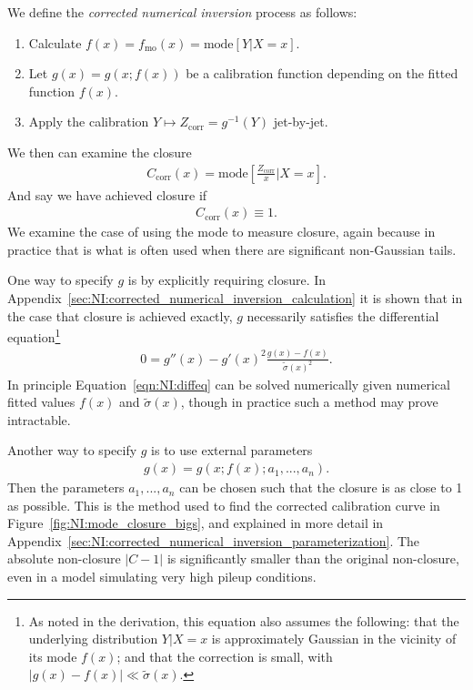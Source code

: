 We define the \emph{corrected numerical inversion} process as follows:
\begin{enumerate}
\item Calculate $f(x)=f_\text{mo}(x)=\text{mode}[Y|X=x]$.
\item Let $g(x) = g(x;f(x))$ be a calibration function depending on the fitted function $f(x)$.
\item Apply the calibration $Y\mapsto Z_\text{corr}=g^{-1}(Y)$ jet-by-jet.
\end{enumerate}
We then can examine the closure
\begin{align}
C_\text{corr}(x) = \text{mode}\left[\frac{Z_\text{corr}}{x}\Big|X=x\right].
\end{align}
And say we have achieved closure if
\begin{align}
C_\text{corr}(x) \equiv 1.
\end{align}
We examine the case of using the mode to measure closure, again because in practice that is what is often used when there are significant non-Gaussian tails. 

One way to specify $g$ is by explicitly requiring closure. In Appendix~\ref{sec:NI:corrected_numerical_inversion_calculation} it is shown that in the case that closure is achieved exactly, $g$ necessarily satisfies the differential equation\footnote{As noted in the derivation, this equation also assumes the following: that the underlying distribution $Y|X=x$ is approximately Gaussian in the vicinity of its mode $f(x)$; and that the correction is small, with $|g(x)-f(x)|\ll \tilde{\sigma}(x)$.}
\begin{align}
0=g''(x)-g'(x)^2\frac{g(x)-f(x)}{\tilde{\sigma}(x)^2}.
\label{eqn:NI:diffeq}
\end{align}
In principle Equation~\ref{eqn:NI:diffeq} can be solved numerically given numerical fitted values $f(x)$ and $\tilde{\sigma}(x)$, though in practice such a method may prove intractable.

Another way to specify $g$ is to use external parameters
\begin{align}
g(x) = g(x;f(x);a_1,...,a_n).
\end{align}
Then the parameters $a_1,...,a_n$ can be chosen such that the closure is as close to 1 as possible. This is the method used to find the corrected calibration curve in Figure~\ref{fig:NI:mode_closure_bigs}, and explained in more detail in Appendix~\ref{sec:NI:corrected_numerical_inversion_parameterization}. The absolute non-closure $|C-1|$ is significantly smaller than the original non-closure, even in a model simulating very high pileup conditions.

